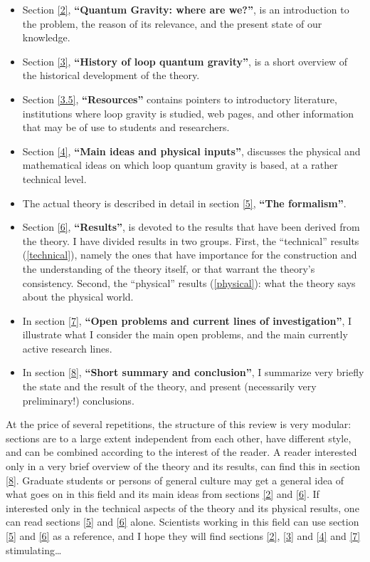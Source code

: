 \begin{itemize}

\item Section \ref{2}, \textbf{``Quantum Gravity: where are we?''}, is 
an introduction to the problem, the reason of its 
relevance, and the present state of our knowledge.

\item Section \ref{3}, \textbf{``History of loop quantum gravity''}, is 
a short overview of the historical development of the theory. 

\item Section \ref{3.5}, \textbf{``Resources''} contains pointers to 
introductory literature, institutions where loop gravity is 
studied, web pages, and other information that may be of use to 
students and researchers.

\item Section \ref{4}, \textbf{``Main ideas and physical inputs''}, 
discusses the physical and mathematical ideas on which loop 
quantum gravity is based, at a rather technical level.

\item The actual theory is described in detail in section \ref{5}, 
\textbf{``The formalism''}. 

\item Section \ref{6}, \textbf{``Results''}, is devoted to the results 
that have been derived from the theory.  I have divided results in two 
groups.  First, the ``technical'' results (\ref{technical}), namely the 
ones that have importance for the construction and the understanding 
of the theory itself, or that warrant the theory's consistency.  
Second, the ``physical'' results (\ref{physical}): what the theory says 
about the physical world.

\item In section \ref{7}, \textbf{``Open problems and current 
lines of investigation''}, I illustrate what I consider the main 
open problems, and the main currently active research lines.

\item In section \ref{8}, \textbf{``Short summary and 
conclusion''}, I summarize very briefly the state and the result 
of the theory, and present (necessarily very preliminary!)  
conclusions.

\end{itemize}

At the price of several repetitions, the structure of this review is very 
modular: sections are to a large extent independent from each other, 
have different style, and can be combined according to the interest of 
the reader.  A reader interested only in a very brief overview of the 
theory and its results, can find this in section \ref{8}.  Graduate 
students or persons of general culture may get a general idea of what 
goes on in this field and its main ideas from sections \ref{2} and 
\ref{6}.  If interested only in the technical aspects of the theory 
and its physical results, one can read sections \ref{5} and \ref{6} 
alone.  Scientists working in this field can use section \ref{5} and 
\ref{6} as a reference, and I hope they will find sections \ref{2}, 
\ref{3} and \ref{4} and \ref{7} stimulating\ldots

